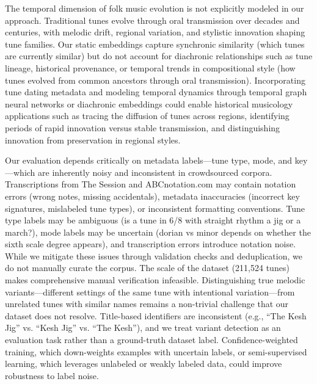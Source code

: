 \documentclass[]{interact}
\theoremstyle{plain}
\theoremstyle{definition}
\theoremstyle{remark}
\begin{document}
The temporal dimension of folk music evolution is not explicitly modeled in our approach. Traditional tunes evolve through oral transmission over decades and centuries, with melodic drift, regional variation, and stylistic innovation shaping tune families. Our static embeddings capture synchronic similarity (which tunes are currently similar) but do not account for diachronic relationships such as tune lineage, historical provenance, or temporal trends in compositional style (how tunes evolved from common ancestors through oral transmission). Incorporating tune dating metadata and modeling temporal dynamics through temporal graph neural networks or diachronic embeddings could enable historical musicology applications such as tracing the diffusion of tunes across regions, identifying periods of rapid innovation versus stable transmission, and distinguishing innovation from preservation in regional styles.

Our evaluation depends critically on metadata labels—tune type, mode, and key—which are inherently noisy and inconsistent in crowdsourced corpora. Transcriptions from The Session and ABCnotation.com may contain notation errors (wrong notes, missing accidentals), metadata inaccuracies (incorrect key signatures, mislabeled tune types), or inconsistent formatting conventions. Tune type labels may be ambiguous (is a tune in 6/8 with straight rhythm a jig or a march?), mode labels may be uncertain (dorian vs minor depends on whether the sixth scale degree appears), and transcription errors introduce notation noise. While we mitigate these issues through validation checks and deduplication, we do not manually curate the corpus. The scale of the dataset (211,524 tunes) makes comprehensive manual verification infeasible. Distinguishing true melodic variants—different settings of the same tune with intentional variation—from unrelated tunes with similar names remains a non-trivial challenge that our dataset does not resolve. Title-based identifiers are inconsistent (e.g., ``The Kesh Jig'' vs. ``Kesh Jig'' vs. ``The Kesh''), and we treat variant detection as an evaluation task rather than a ground-truth dataset label. Confidence-weighted training, which down-weights examples with uncertain labels, or semi-supervised learning, which leverages unlabeled or weakly labeled data, could improve robustness to label noise.
\end{document}
